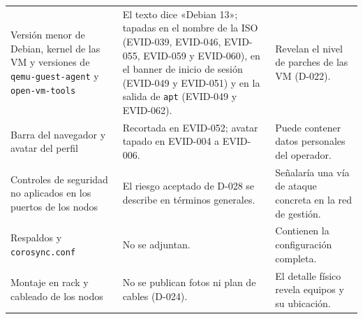 \documentclass[11pt,a4paper]{article}
\begin{document}
{\begin{longtable}{L{3.4cm} L{6.0cm} L{5.6cm}}
  Versión menor de Debian, kernel de las VM y versiones de \texttt{qemu-guest-agent} y \texttt{open-vm-tools} & El texto dice «Debian 13»; tapadas en el nombre de la ISO (EVID-039, EVID-046, EVID-055, EVID-059 y EVID-060), en el banner de inicio de sesión (EVID-049 y EVID-051) y en la salida de \texttt{apt} (EVID-049 y EVID-062). & Revelan el nivel de parches de las VM (D-022).\\
  Barra del navegador y avatar del perfil & Recortada en EVID-052; avatar tapado en EVID-004 a EVID-006. & Puede contener datos personales del operador.\\
  Controles de seguridad no aplicados en los puertos de los nodos & El riesgo aceptado de D-028 se describe en términos generales. & Señalaría una vía de ataque concreta en la red de gestión.\\
  Respaldos y \texttt{corosync.conf} & No se adjuntan. & Contienen la configuración completa.\\
  Montaje en rack y cableado de los nodos & No se publican fotos ni plan de cables (D-024). & El detalle físico revela equipos y su ubicación.\\
  \bottomrule
\end{longtable}
}

\end{document}

